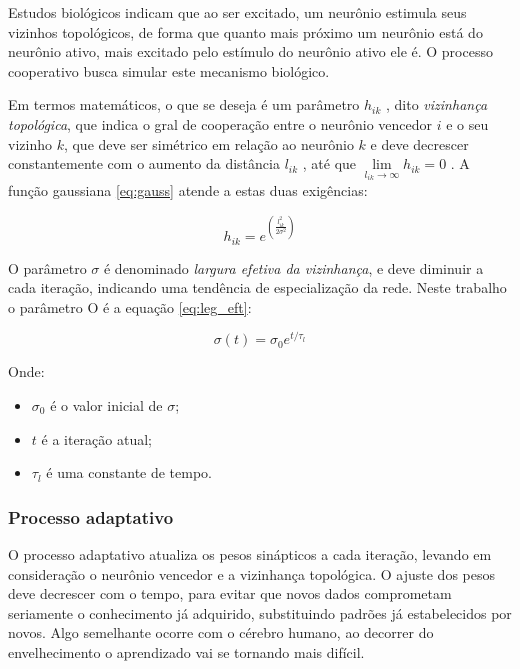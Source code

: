 Estudos biológicos indicam que ao ser excitado, um neurônio estimula seus
vizinhos topológicos, de forma que quanto mais próximo um neurônio está do
neurônio ativo, mais excitado pelo estímulo do neurônio ativo ele é. O processo
cooperativo busca simular este mecanismo biológico.

Em termos matemáticos, o que se deseja é um parâmetro $ h_{ik} $ , dito
\textit{vizinhança topológica}, que indica o gral de cooperação entre o
neurônio vencedor $ i $ e o seu vizinho $ k $, que deve ser simétrico em relação
ao neurônio $ k $ e deve decrescer constantemente com o aumento da
distância $ l_{ik} $ , até que $ \lim\limits_{ l_{ik} \to \infty } h_{ik} = 0 $ .
A função gaussiana \ref{eq:gauss} atende a estas duas exigências:

\begin{equation}\label{eq:gauss}
h_{ik} = e^{ \left( \frac{ l_{ik}^2 }{ 2 \sigma^2 } \right) }
\end{equation}


O parâmetro $ \sigma $ é denominado \textit{largura efetiva da vizinhança},
e deve diminuir a cada iteração, indicando uma tendência de especialização da
rede. Neste trabalho o parâmetro O é a equação \ref{eq:leg_eft}:

\begin{equation}\label{eq:leg_eft}
\sigma(t) = \sigma_0 e^{ t / \tau_l }
\end{equation}

Onde:

\begin{itemize}
\item $ \sigma_0 $ é o valor inicial de $ \sigma $;
\item $ t $ é a iteração atual;
\item $ \tau_l $ é uma constante de tempo.
\end{itemize}

\subsubsection{Processo adaptativo}

O processo adaptativo atualiza os pesos sinápticos a cada iteração, levando em
consideração o neurônio vencedor e a vizinhança topológica. O ajuste dos pesos
deve decrescer com o tempo, para evitar que novos dados comprometam seriamente
o conhecimento já adquirido, substituindo padrões já estabelecidos por novos.
Algo semelhante ocorre com o cérebro humano, ao decorrer do envelhecimento o
aprendizado vai se tornando mais difícil.

